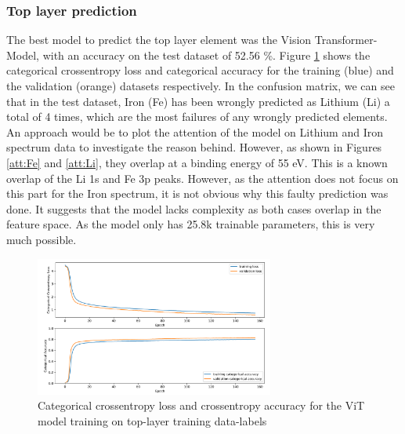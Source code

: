 \subsubsection{Top layer prediction}
The best model to predict the top layer element was the Vision Transformer-Model, with an accuracy on the test dataset of 52.56 \%. Figure \ref{fig:top_best_loss} shows the categorical crossentropy loss and categorical accuracy for the training (blue) and the validation (orange) datasets respectively. In the confusion matrix, we can see that in the test dataset, Iron (Fe) has been wrongly predicted as Lithium (Li) a total of 4 times, which are the most failures of any wrongly predicted elements. An approach would be to plot the attention of the model on Lithium and Iron spectrum data to investigate the reason behind. However, as shown in Figures \ref{att:Fe} and \ref{att:Li}, they overlap at a binding energy of 55 eV. This is a known overlap of the Li 1s and Fe 3p peaks. However, as the attention does not focus on this part for the Iron spectrum, it is not obvious why this faulty prediction was done. It suggests that the model lacks complexity as both cases overlap in the feature space. As the model only has 25.8k trainable parameters, this is very much possible. 


\begin{figure}[H]
    \centering
    \includegraphics[width=0.7\textwidth]{Figures/best_task_1_model_loss.png}
    \caption{Categorical crossentropy loss and crossentropy accuracy for the ViT model training on top-layer training data-labels}
    \label{fig:top_best_loss}
\end{figure}

